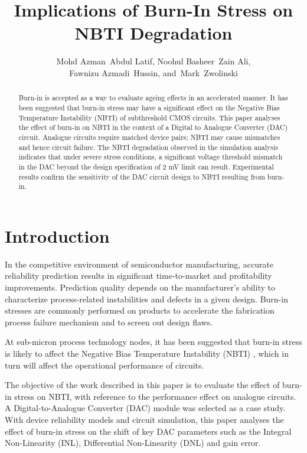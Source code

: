 \documentclass[11pt,a4paper]{article}
\title{Implications of Burn-In Stress  on NBTI Degradation}
\author{Mohd Azman~Abdul Latif,
        Noohul Basheer~Zain Ali, \\
Fawnizu Azmadi~Hussin, and~Mark~Zwolinski}
\date{}
\begin{document}
\maketitle





\begin{abstract}
Burn-in is accepted as a way to evaluate ageing effects in an accelerated manner. It has been suggested that burn-in stress may have a significant effect on the Negative Bias Temperature Instability (NBTI) of subthreshold CMOS circuits.  This paper analyses the effect of burn-in on NBTI in the context of a Digital to Analogue Converter (DAC) circuit. Analogue circuits require matched device pairs; NBTI  may cause mismatches and hence circuit failure.   The NBTI degradation observed in the simulation analysis indicates that under severe stress conditions, a significant voltage threshold mismatch in the DAC beyond the design specification of 2 mV limit can result. Experimental results confirm the sensitivity of the DAC circuit design to NBTI resulting from burn-in. 
\end{abstract}











\section{Introduction}

In the competitive environment of semiconductor manufacturing, accurate 
reliability prediction results in significant time-to-market and profitability improvements. Prediction quality depends on the manufacturer's ability to characterize process-related instabilities and defects in a given design. 
Burn-in stresses are commonly performed on products to accelerate the fabrication process failure mechanism and to screen out design flaws. 

At sub-micron process technology nodes, it has been suggested that burn-in stress is likely to affect the Negative Bias Temperature Instability (NBTI) \cite{Schroder}, which in turn will affect the operational performance of circuits.

The objective of the work described in this paper is to evaluate the effect of burn-in stress on NBTI, with reference to the performance effect on analogue circuits. A  Digital-to-Analogue Converter (DAC) module was selected as a case study. 
With device reliability models and circuit simulation, this paper analyses the effect of burn-in stress on the shift of key DAC parameters such as the  Integral Non-Linearity (INL), Differential Non-Linearity (DNL) and gain error. 
\end{document}
